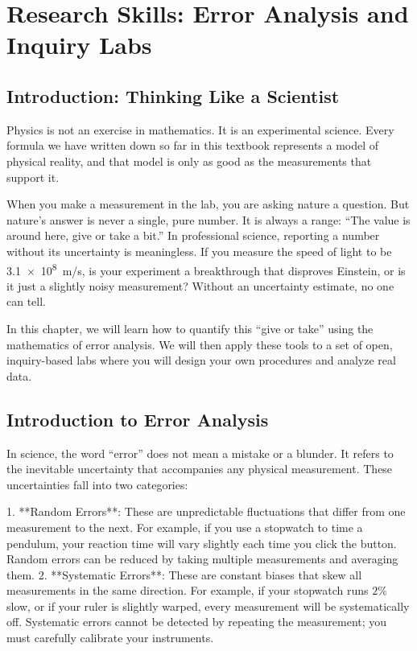 \chapter{Research Skills: Error Analysis and Inquiry Labs}

\section{Introduction: Thinking Like a Scientist}

Physics is not an exercise in mathematics. It is an experimental science. Every formula we have written down so far in this textbook represents a model of physical reality, and that model is only as good as the measurements that support it. 

When you make a measurement in the lab, you are asking nature a question. But nature’s answer is never a single, pure number. It is always a range: ``The value is around here, give or take a bit.'' In professional science, reporting a number without its uncertainty is meaningless. If you measure the speed of light to be \SI{3.1e8}{m/s}, is your experiment a breakthrough that disproves Einstein, or is it just a slightly noisy measurement? Without an uncertainty estimate, no one can tell.

In this chapter, we will learn how to quantify this ``give or take'' using the mathematics of error analysis. We will then apply these tools to a set of open, inquiry-based labs where you will design your own procedures and analyze real data.

\section{Introduction to Error Analysis}

In science, the word ``error'' does not mean a mistake or a blunder. It refers to the inevitable uncertainty that accompanies any physical measurement. These uncertainties fall into two categories:

1. **Random Errors**: These are unpredictable fluctuations that differ from one measurement to the next. For example, if you use a stopwatch to time a pendulum, your reaction time will vary slightly each time you click the button. Random errors can be reduced by taking multiple measurements and averaging them.
2. **Systematic Errors**: These are constant biases that skew all measurements in the same direction. For example, if your stopwatch runs $2\%$ slow, or if your ruler is slightly warped, every measurement will be systematically off. Systematic errors cannot be detected by repeating the measurement; you must carefully calibrate your instruments.

